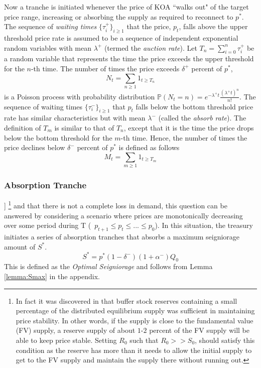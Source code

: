 Now a tranche is initiated whenever the price of KOA ``walks out" of the target price range, increasing or absorbing the supply as required to reconnect to $p^*$. The sequence of \textit{waiting times} $\{ \tau^+_i \}_{i \geq 1}$ that the price, $p_t$, falls above the upper threshold price rate is assumed to be a sequence of independent exponential random variables with mean $\lambda^+$ (termed the \textit{auction rate}). Let $T_n = \sum_{i=0}^n \tau_i^+$  be a random variable that represents the time the price exceeds the upper threshold for the $n$-th time. The number of times the price exceeds $\delta^+$ percent of $p^*$,
%
\begin{equation} \label{eq:bullcount}
N_t = \sum_{n \geq 1} 1_{t \geq T_n} 
\end{equation}
%
is a Poisson process with probability distribution $\mathbb{P}(N_t = n) = e^{-\lambda^+ t} \frac{(\lambda^+ t)^n}{n!}$. The sequence of waiting times $\{ \tau^-_i \}_{i \geq 1}$ that $p_t$ falls below the bottom threshold price rate has similar characteristics but with mean $\lambda^-$ (called the \textit{absorb rate}). The definition of $T_m$ is similar to that of $T_n$, except that it is the time the price drops below the bottom threshold for the $m$-th time. Hence, the number of times the price declines below $\delta^-$ percent of $p^*$ is defined as follows
%
\begin{equation} \label{eq:bearcount}
M_t = \sum_{m \geq 1} 1_{t \geq T_m} 
\end{equation}

\subsubsection{Absorption Tranche}
 ]%
%
\footnote{In fact it was discovered in \cite{Ath08} that buffer stock reserves containing a small percentage of the distributed equilibrium supply was sufficient in maintaining price stability. In other words, if the supply is close to the fundamental value (FV) supply, a reserve supply of about $1$-$2$ percent of the FV supply will be able to keep price stable. Setting $R_0$ such that $R_0 >> S_0$, should satisfy this condition as the reserve has more than it needs to allow the initial supply to get to the FV supply and maintain the supply there without running out.} 
%
and that there is not a complete loss in demand, this question can be answered by considering a scenario where prices are monotonically decreasing over some period during T (\ie\ $p_{t+1} \leq p_t \leq ... \leq p_0$). In this situation, the treasury initiates a series of absorption tranches that absorbs a maximum seigniorage amount of $S^*$. 
%
\begin{equation} \label{eq:Smax}
S^* = p^*(1-\delta^-)(1+\alpha^-)Q_0
\end{equation}
%
This is defined as the \textit{Optimal Seigniorage} and follows from Lemma \ref{lemma:Smax} in the appendix.

